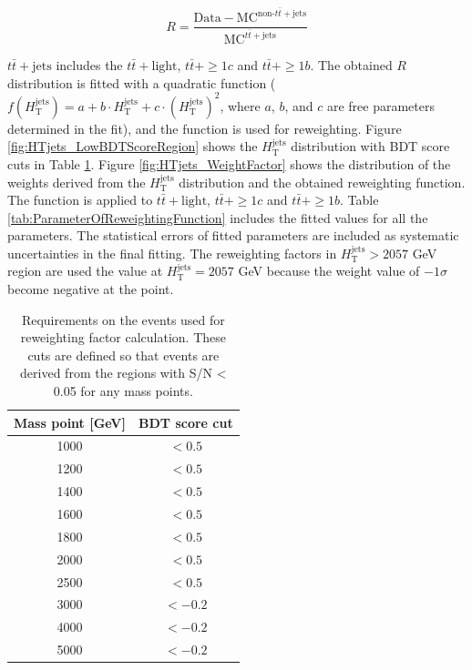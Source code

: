\begin{equation}
  R = \frac{\text{Data}-\text{MC}^{\text{non-}t\bar{t}+\text{jets}}}{\text{MC}^{t\bar{t}+\text{jets}}}
\end{equation}

$t\bar{t}+\text{jets}$ includes the $t\bar{t}+\text{light}$, $t\bar{t}+\geq1c$ and $t\bar{t}+\geq1b$. The obtained $R$ distribution is fitted with a quadratic function ($f(H_{\text{T}}^{\text{jets}}) = a + b \cdot H_{\text{T}}^{\text{jets}} + c \cdot (H_{\text{T}}^{\text{jets}})^{2}$, where $a$, $b$, and $c$ are free parameters determined in the fit), and the function is used for reweighting. Figure \ref{fig:HTjets_LowBDTScoreRegion} shows the $H_{\text{T}}^{\text{jets}}$ distribution with BDT score cuts in Table \ref{tab:ReqForRWControlRegion}. Figure \ref{fig:HTjets_WeightFactor} shows the distribution of the weights derived from the $H_{\text{T}}^{\text{jets}}$ distribution and the obtained reweighting function. The function is applied to $t\bar{t}+\text{light}$, $t\bar{t}+\geq1c$ and $t\bar{t}+\geq1b$. Table \ref{tab:ParameterOfReweightingFunction} includes the fitted values for all the parameters. The statistical errors of fitted parameters are included as systematic uncertainties in the final fitting. The reweighting factors in $H_{\text{T}}^{\text{jets}}>2057$ GeV region are used the value at $H_{\text{T}}^{\text{jets}}=2057$ GeV because the weight value of $-1\sigma$ become negative at the point.

\begin{table}[H]
  \centering
  \begin{tabular*}{70mm}{@{\extracolsep{\fill}}cc}
    \hline\hline
    Mass point [GeV] & BDT score cut\\
    \hline
    1000             & $< 0.5$\\
    1200             & $< 0.5$\\
    1400             & $< 0.5$\\
    1600             & $< 0.5$\\
    1800             & $< 0.5$\\
    2000             & $< 0.5$\\
    2500             & $< 0.5$\\
    3000             & $<-0.2$\\
    4000             & $<-0.2$\\
    5000             & $<-0.2$\\
    \hline\hline
  \end{tabular*}
  \caption{Requirements on the events used for reweighting factor calculation. These cuts are defined so that events are derived from the regions with S/N < 0.05 for any mass points.}
  \label{tab:ReqForRWControlRegion}
\end{table}



